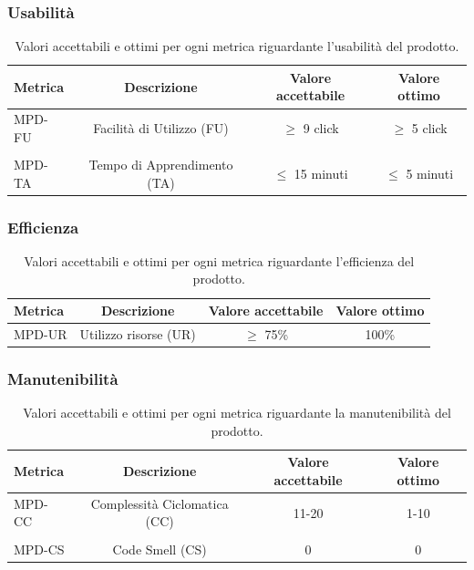 \documentclass[8pt]{article}
\begin{document}
\subsubsection{Usabilità}
\begin{table}[H]	
	\centering
	\begin{tabular}{lccc}
		\toprule
		\textbf{Metrica}& \textbf{Descrizione} & \textbf{Valore accettabile} & \textbf{Valore ottimo} \\
		\midrule
		MPD-FU & Facilità di Utilizzo (FU) & $\geq$ 9 click & $\geq$ 5 click \\\\
		MPD-TA & Tempo di Apprendimento (TA) & $\leq$ 15 minuti & $\leq$ 5 minuti \\
		\bottomrule
	\end{tabular}
	\caption{Valori accettabili e ottimi per ogni metrica riguardante l’usabilità del prodotto.}
	\label{table:Valori accettabili e ottimi per ogni metrica riguardante l’usabilità del prodotto.}
\end{table}
\subsubsection{Efficienza}
\begin{table}[H]	
	\centering
	\begin{tabular}{lccc}
		\toprule
		\textbf{Metrica}& \textbf{Descrizione} & \textbf{Valore accettabile} & \textbf{Valore ottimo} \\
		\midrule
		MPD-UR & Utilizzo risorse (UR) & $\geq$ 75\% & 100\% \\
		\bottomrule
	\end{tabular}
	\caption{Valori accettabili e ottimi per ogni metrica riguardante l’efficienza del prodotto.}
	\label{table:Valori accettabili e ottimi per ogni metrica riguardante l’efficienza del prodotto.}
\end{table}
\subsubsection{Manutenibilità}
\begin{table}[H]	
	\centering
	\begin{tabular}{lccc}
		\toprule
		\textbf{Metrica}& \textbf{Descrizione} & \textbf{Valore accettabile} & \textbf{Valore ottimo} \\
		\midrule
		MPD-CC & Complessità Ciclomatica (CC) & 11-20 & 1-10 \\\\
		MPD-CS & Code Smell (CS) & 0 & 0 \\
		\bottomrule
	\end{tabular}
	\caption{Valori accettabili e ottimi per ogni metrica riguardante la manutenibilità del prodotto.}
	\label{table:Valori accettabili e ottimi per ogni metrica riguardante la manutenibilità del prodotto.}
\end{table}
\clearpage
\end{document}
